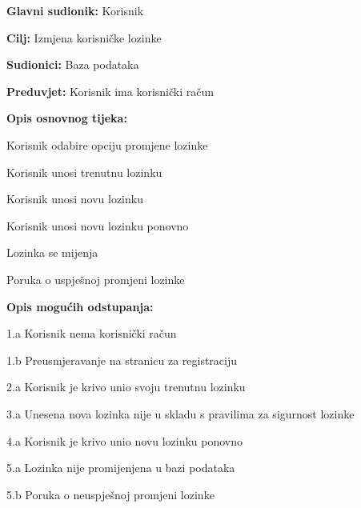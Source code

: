 					\noindent {}
					\begin{packed_item}
						\item \textbf{Glavni sudionik:} Korisnik
						\item \textbf{Cilj:} Izmjena korisničke lozinke
						\item \textbf{Sudionici:} Baza podataka
						\item \textbf{Preduvjet:} Korisnik ima korisnički račun
						\item \textbf{Opis osnovnog tijeka:}
						\begin{packed_enum}
							\item Korisnik odabire opciju promjene lozinke
							\item Korisnik unosi trenutnu lozinku
							\item Korisnik unosi novu lozinku
							\item Korisnik unosi novu lozinku ponovno
							\item Lozinka se mijenja
							\item Poruka o uspješnoj promjeni lozinke
						\end{packed_enum}
						\item \textbf{Opis mogućih odstupanja:}
						\begin{packed_item}
							\item 1.a Korisnik nema korisnički račun
							\item 1.b Preusmjeravanje na stranicu za registraciju
							\item 2.a Korisnik je krivo unio svoju trenutnu lozinku
							\item 3.a Unesena nova lozinka nije u skladu s pravilima za sigurnost lozinke
							\item 4.a Korisnik je krivo unio novu lozinku ponovno
							\item 5.a Lozinka nije promijenjena u bazi podataka
							\item 5.b Poruka o neuspješnoj promjeni lozinke
						\end{packed_item}
					\end{packed_item}
					\noindent {}

